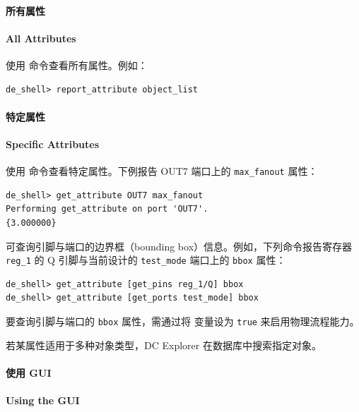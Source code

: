 \paragraph{所有属性}
\paragraph*{All Attributes}

使用  命令查看所有属性。例如：
\begin{lstlisting}
de_shell> report_attribute object_list
\end{lstlisting}

\paragraph{特定属性}
\paragraph*{Specific Attributes}

使用  命令查看特定属性。下例报告 OUT7 端口上的 \texttt{max\_fanout} 属性：
\begin{lstlisting}
de_shell> get_attribute OUT7 max_fanout
Performing get_attribute on port 'OUT7'.
{3.000000}
\end{lstlisting}

可查询引脚与端口的边界框（bounding box）信息。例如，下列命令报告寄存器 \texttt{reg\_1} 的 Q 引脚与当前设计的 \texttt{test\_mode} 端口上的 \texttt{bbox} 属性：
\begin{lstlisting}
de_shell> get_attribute [get_pins reg_1/Q] bbox
de_shell> get_attribute [get_ports test_mode] bbox
\end{lstlisting}

\begin{noteBox}
要查询引脚与端口的 \texttt{bbox} 属性，需通过将  变量设为 \texttt{true} 来启用物理流程能力。
\end{noteBox}

若某属性适用于多种对象类型，DC Explorer 在数据库中搜索指定对象。

\paragraph{使用 GUI}
\paragraph*{Using the GUI}

